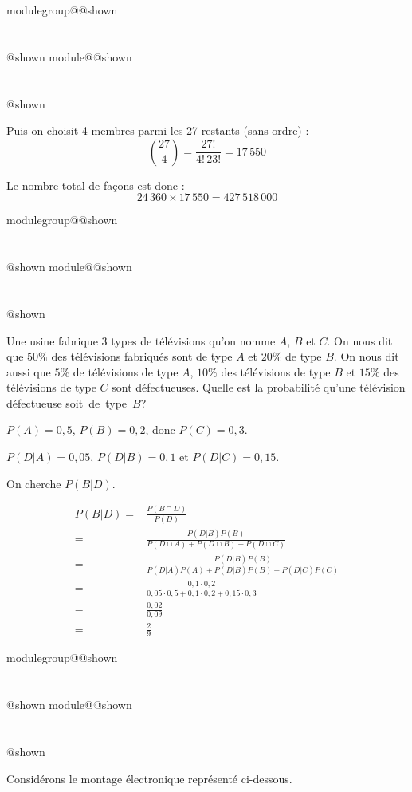\documentclass{Evaluation}
\makeatletter
\newcommand{\currentmodulekey}{}
\newcommand{\currentmoduletitle}{}
\newcommand{\currentgroupkey}{}
\newcommand{\currentgrouptitle}{}
\newcommand{\showmoduleifneeded}{%
  \ifx\currentgroupkey\empty\else
    \expandafter\ifx\csname modulegroup@\currentgroupkey @shown\endcsname\relax
      \section*{\currentgrouptitle}%
      \expandafter\gdef\csname modulegroup@\currentgroupkey @shown\endcsname{1}%
    \fi
  \fi
  \expandafter\ifx\csname module@\currentmodulekey @shown\endcsname\relax
    \section*{\currentmoduletitle}%
    \expandafter\gdef\csname module@\currentmodulekey @shown\endcsname{1}%
  \fi
}
\newenvironment{H23}{\showmoduleifneeded}{}
\newenvironment{A23}{\showmoduleifneeded}{}
\makeatother
\begin{document}
\begin{questions}
\begin{H23}
\begin{solution}
Puis on choisit 4 membres parmi les 27 restants (sans ordre) :
$$\binom{27}{4} = \frac{27!}{4!\,23!} = 17\,550$$

Le nombre total de façons est donc :
$$24\,360 \times 17\,550 = 427\,518\,000$$
\end{solution}
\end{H23}

\begin{H23}
\question {} %
Une usine fabrique 3 types de télévisions qu'on nomme $A$, $B$ et $C$. On nous dit que $50\%$ des télévisions fabriqués sont de type $A$ et $20\%$ de type $B$. On nous dit aussi que $5\%$ de télévisions de type $A$, $10\%$ des télévisions de type $B$ et $15\%$ des télévisions de type $C$ sont défectueuses. Quelle est la probabilité qu'une télévision défectueuse soit~de~type~$B$?

\begin{solution}
$P(A)=0,5$, $P(B)=0,2$, donc $P(C)=0,3$.

$P(D|A)=0,05$, $P(D|B)=0,1$ et $P(D|C)=0,15$.

On cherche $P(B|D)$.

\begin{align*}
    P(B|D) = & \frac{P(B\cap D)}{P(D)}\\
    =& \frac{P(D|B)P(B)}{P(D\cap A)+P(D\cap B) + P(D\cap C)}\\
    =&\frac{P(D|B)P(B)}{P(D| A)P(A)+P(D|B)P(B) + P(D| C)P(C)}\\
    =&\frac{0,1 \cdot 0,2}{0,05\cdot 0,5 + 0,1 \cdot 0,2 + 0,15 \cdot 0,3}\\
    =& \frac{0,02}{0,09}\\
    =& \frac{2}{9}
\end{align*}
\end{solution}
\end{H23}

\begin{A23}
\question {} %
\label{A23-I3-probaQCM} Considérons le montage électronique représenté ci-dessous.
	
\begin{figure}[h!]
    \label{A23-I3-fig:montage}
    \begin{center}	
\end{center}
\end{figure}
\end{A23}
\end{questions}
\end{document}
